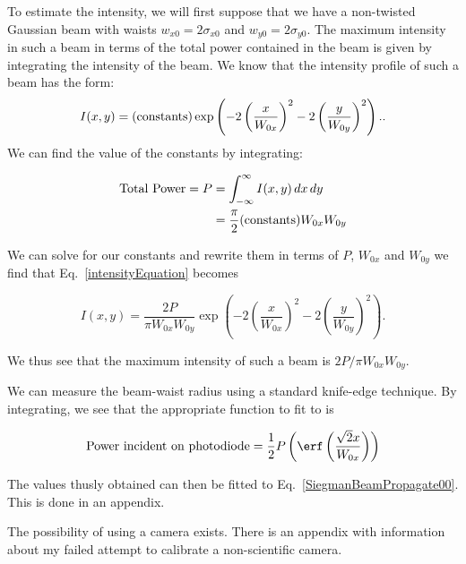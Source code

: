 To estimate the intensity, we will first suppose that we have a non-twisted Gaussian beam with waists $w_{x0}=2 \sigma_{x0}$ and $w_{y0}=2 \sigma_{y0}$. The maximum intensity in such a beam in terms of the total power contained in the beam is given by integrating the intensity of the beam. We know that the intensity profile of such a beam has the form:
\begin{equation}
I(x,y)=({\rm constants}) \exp \left( -2 \left(\frac{x}{W_{0x}} \right)^2-2 \left( \frac{y}{W_{0y}}\right)^2\right). \label{intensityEquation}.
\end{equation}
We can find the value of the constants by integrating:%

\begin{align}
{\rm Total\ Power}=P&=\int_{-\infty}^\infty I(x,y)\, dx\, dy\\
&=\frac{\pi}{2}({\rm constants}) W_{0x} W_{0y}
\end{align}

We can solve for our constants and rewrite them in terms of $P$, $W_{0x}$ and $W_{0y}$ we find that Eq.\ \ref{intensityEquation} becomes 

\begin{equation}
I(x,y)= \frac{2 P}{\pi W_{0x} W_{0y}}\exp \left( -2 \left(\frac{x}{W_{0x}} \right)^2-2 \left( \frac{y}{W_{0y}}\right)^2\right). \label{intensityEquation2}
\end{equation}

We thus see that the maximum intensity of such a beam is $2P/\pi W_{0x}W_{0y}$.

We can measure the beam-waist radius using a standard knife-edge technique. By integrating, we see that the appropriate function to fit to is 

\begin{equation}
{\rm Power\ incident\ on\ photodiode}=\frac{1}{2} P \left(\erf \left( \frac{\sqrt{2} x}{W_{0x}}\right)\right)
\end{equation}


The values thusly obtained can then be fitted to Eq.\ \ref{SiegmanBeamPropagate00}. This is done in an appendix. 


The possibility of using a camera exists. There is an appendix with information about my failed attempt to calibrate a non-scientific camera. 


